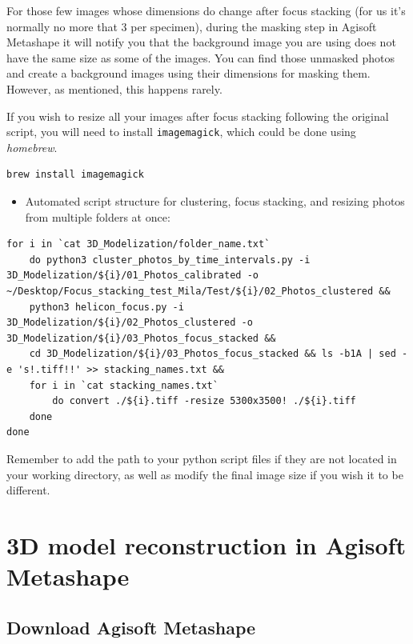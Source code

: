 \documentclass[
]{book}
\providecommand{\tightlist}{%
  \setlength{\itemsep}{0pt}\setlength{\parskip}{0pt}}
\begin{document}
For those few images whose dimensions do change after focus stacking (for us it's
normally no more that 3 per specimen), during the masking step in Agisoft Metashape
it will notify you that the background image you are using does not have the same
size as some of the images. You can find those unmasked photos and create a background
images using their dimensions for masking them. However, as mentioned, this happens
rarely.

If you wish to resize all your images after focus stacking following the original script,
you will need to install \texttt{imagemagick}, which could be done using \emph{homebrew}.

\begin{verbatim}
brew install imagemagick
\end{verbatim}

\begin{itemize}
\tightlist
\item
  Automated script structure for clustering, focus stacking, and resizing photos from multiple folders at once:
\end{itemize}

\begin{verbatim}
for i in `cat 3D_Modelization/folder_name.txt`
    do python3 cluster_photos_by_time_intervals.py -i 3D_Modelization/${i}/01_Photos_calibrated -o ~/Desktop/Focus_stacking_test_Mila/Test/${i}/02_Photos_clustered &&
    python3 helicon_focus.py -i 3D_Modelization/${i}/02_Photos_clustered -o 3D_Modelization/${i}/03_Photos_focus_stacked &&
    cd 3D_Modelization/${i}/03_Photos_focus_stacked && ls -b1A | sed -e 's!.tiff!!' >> stacking_names.txt &&
    for i in `cat stacking_names.txt`
        do convert ./${i}.tiff -resize 5300x3500! ./${i}.tiff
    done
done
\end{verbatim}

Remember to add the path to your python script files if they are not located in your
working directory, as well as modify the final image size if you wish it to be
different.

\hypertarget{d-model-reconstruction-in-agisoft-metashape}{%
\chapter{3D model reconstruction in Agisoft Metashape}\label{d-model-reconstruction-in-agisoft-metashape}}

\hypertarget{download-agisoft-metashape}{%
\section{Download Agisoft Metashape}\label{download-agisoft-metashape}}
\end{document}

